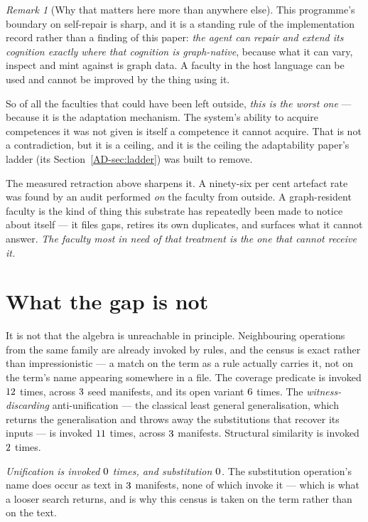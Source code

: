 \documentclass[11pt,a4paper]{article}
\theoremstyle{remark}
\newtheorem{remark}[definition]{Remark}
\begin{document}
\begin{remark}[Why that matters here more than anywhere else]\label{rem:selfrepair}
This programme's boundary on self-repair is sharp, and it is a standing rule of the implementation
record rather than a finding of this paper: \emph{the agent can repair and extend its cognition exactly
where that cognition is graph-native}, because what it can vary, inspect and mint against is graph
data. A faculty in the host language can be used and cannot be improved by the thing using it.

So of all the faculties that could have been left outside, \emph{this is the worst one} --- because it
is the adaptation mechanism. The system's ability to acquire competences it was not given is itself a
competence it cannot acquire. That is not a contradiction, but it is a ceiling, and it is the ceiling
the adaptability paper's ladder (its Section~\ref{AD-sec:ladder}) was built to remove.

The measured retraction above sharpens it. A ninety-six per cent artefact rate was found by an audit
performed \emph{on} the faculty from outside. A graph-resident faculty is the kind of thing this
substrate has repeatedly been made to notice about itself --- it files gaps, retires its own duplicates,
and surfaces what it cannot answer. \emph{The faculty most in need of that treatment is the one that
cannot receive it.}
\end{remark}

\section{What the gap is not}\label{sec:not}
It is not that the algebra is unreachable in principle. Neighbouring operations from the same family
are already invoked by rules, and the census is exact rather than impressionistic --- a match on the
term as a rule actually carries it, not on the term's name appearing somewhere in a file. The coverage
predicate is invoked $12$ times, across $3$ seed manifests, and its open
variant $6$ times. The \emph{witness-discarding} anti-unification --- the classical
least general generalisation, which returns the generalisation and throws away the substitutions that
recover its inputs --- is invoked $11$ times, across $3$
manifests. Structural similarity is invoked $2$ times.

\emph{Unification is invoked $0$ times, and substitution $0$.} The
substitution operation's name does occur as text in $3$ manifests, none of which
invoke it --- which is what a looser search returns, and is why this census is taken on the term rather
than on the text.
\end{document}
